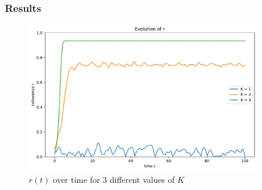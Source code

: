 \documentclass[11pt,a4paper]{article}
\begin{document}
\subsubsection{Results}

\begin{figure}[H]
	\centering
	\includegraphics[width=0.9\textwidth]{graphics/2_t-vs-r_omegaDistr=normal_N=1000_1611577412.pdf}
	\caption{$r(t)$ over time for 3 different values of $K$}
	\label{2}
\end{figure}
\end{document}
